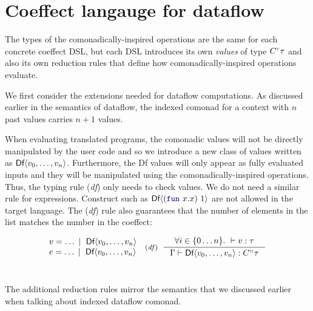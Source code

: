 \documentclass[
		twoside,openright,titlepage,numbers=noenddot,headinclude,%
                footinclude=true,cleardoublepage=empty,
                BCOR=10mm,paper=a4,fontsize=10pt, %
                ngerman,american, %
                ]{scrreprt}
\newcommand{\sep}[0]{\; | \;}
\newcommand{\kvd}[1]{\textnormal{\textcolor{kvdclr}{\ttfamily #1}}}
\newcommand{\ident}[1]{\textnormal{\sffamily #1}}
\newcommand{\ctyp}[2]{C^{#1}#2}
\newcommand{\tyrule}[3]{ \inference[\footnotesize{(\emph{#1})}~~]{#2}{#3} }
\newcommand{\cclrd}[1]{\textcolor{cclr}{#1}}
\begin{document}

\section{Coeffect langauge for dataflow}

The types of the comonadically-inspired operations are the same for each concrete coeffect DSL, but
each DSL introduces its own \emph{values} of type $\ctyp{\cclrd{r}}\tau$ and also its own reduction
rules that define how comonadically-inspired operations evaluate.

We first consider the extensions needed for dataflow computations. As discussed earlier in the
semantics of dataflow, the indexed comonad for a context with $n$ past values carries $n+1$ 
values.

When evaluating translated programs, the comonadic values will not be directly manipulated by the
user code and so we introduce a new class of values written as $\ident{Df}\langle v_0, \ldots, v_n\rangle$. 
Furthermore, the \ident{Df} values will only appear as fully evaluated inputs and they will be manipulated 
using the comonadically-inspired operations. Thus, the typing rule (\emph{df}) only needs to 
check values. We do not need a similar rule for expressions. Construct such as $\ident{Df}\langle(\kvd{fun}~x.x)~1\rangle$ 
are not allowed in the target language. The (\emph{df}) rule also guarantees that the number of 
elements in the list matches the number in the coeffect:

\begin{equation*}
\begin{array}{l}
v = \ldots \sep \ident{Df}\langle v_0, \ldots, v_n\rangle \\
e = \ldots \sep \ident{Df}\langle v_0, \ldots, v_n\rangle \\
\end{array}  
\begin{array}{l}
\tyrule{df}
  { \forall i\in\{ 0 \ldots n \}. ~ \vdash v : \tau}
  { \Gamma \vdash \ident{Df}\langle v_0, \ldots, v_n \rangle : \ctyp{\cclrd{n}}{\tau} }
\end{array}  
\end{equation*}
~

\noindent
The additional reduction rules mirror the semantics that we discussed earlier when talking about
indexed dataflow comonad.
\end{document}
